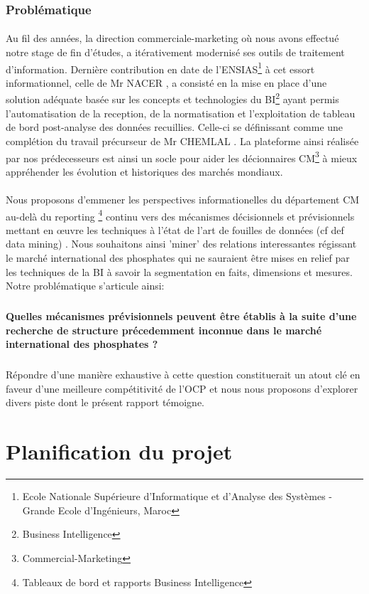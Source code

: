 	\subsubsection{Problématique}
	
	\paragraph{}
Au fil des années, la direction commerciale-marketing où nous avons effectué notre stage de fin d'études, a itérativement modernisé ses outils de traitement d'information. Dernière contribution en date de l'ENSIAS\footnote{Ecole Nationale Supérieure d'Informatique et d'Analyse des Systèmes - Grande Ecole d'Ingénieurs, Maroc} à cet essort informationnel, celle de Mr NACER \cite{NACER}, a consisté en la mise en place d'une solution adéquate basée sur les concepts et technologies du BI\footnote{Business Intelligence} ayant permis l'automatisation de la reception, de la normatisation et l'exploitation de tableau de bord post-analyse des données recuillies. Celle-ci se définissant comme une complétion du travail précurseur de Mr CHEMLAL \cite{CHEMLAL}.  La plateforme ainsi réalisée par nos prédecesseurs est ainsi un socle pour aider les décionnaires CM\footnote{Commercial-Marketing} à mieux appréhender les évolution et historiques des marchés mondiaux.
\paragraph{}Nous proposons d'emmener les perspectives informationelles du département CM au-delà du reporting \footnote{Tableaux de bord et rapports Business Intelligence} continu vers des mécanismes décisionnels et prévisionnels mettant en œuvre les techniques à l'état de l'art de fouilles de données (cf def data mining) . Nous souhaitons ainsi 'miner' des relations interessantes régissant le marché international des phosphates qui ne sauraient être mises en relief par les techniques de la BI à savoir la segmentation en faits, dimensions et mesures. Notre problématique s'articule ainsi:\subparagraph*{}\textbf{Quelles mécanismes prévisionnels peuvent être établis à la suite d'une recherche de structure précedemment inconnue dans le marché international des phosphates ?}\subparagraph*{}Répondre d'une manière exhaustive à cette question constituerait un atout clé en faveur d'une meilleure compétitivité de l'OCP et nous nous proposons d'explorer divers piste dont le présent rapport témoigne. 
\section{Planification du projet}
